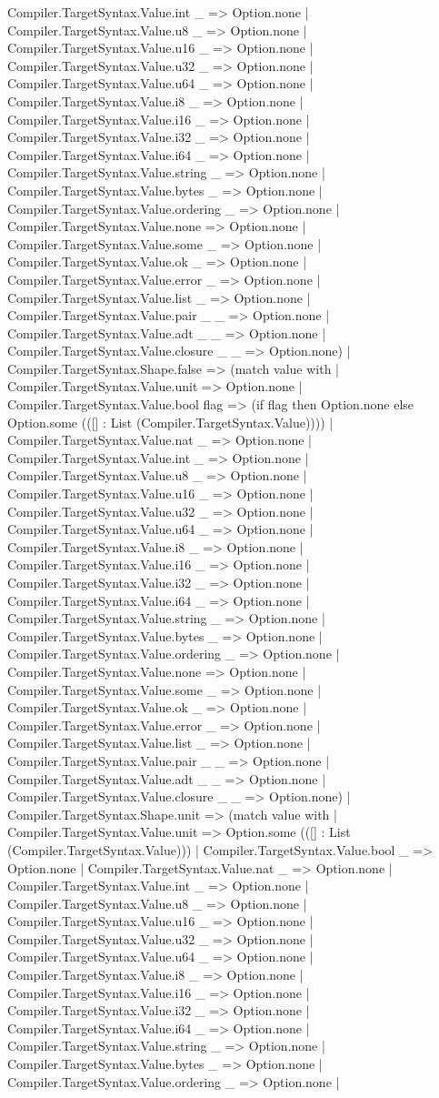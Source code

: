 \documentclass[11pt]{article}
\begin{document}
Compiler.TargetSyntax.Value.int \_ => Option.none | Compiler.TargetSyntax.Value.u8 \_ => Option.none | Compiler.TargetSyntax.Value.u16 \_ => Option.none | Compiler.TargetSyntax.Value.u32 \_ => Option.none | Compiler.TargetSyntax.Value.u64 \_ => Option.none | Compiler.TargetSyntax.Value.i8 \_ => Option.none | Compiler.TargetSyntax.Value.i16 \_ => Option.none | Compiler.TargetSyntax.Value.i32 \_ => Option.none | Compiler.TargetSyntax.Value.i64 \_ => Option.none | Compiler.TargetSyntax.Value.string \_ => Option.none | Compiler.TargetSyntax.Value.bytes \_ => Option.none | Compiler.TargetSyntax.Value.ordering \_ => Option.none | Compiler.TargetSyntax.Value.none => Option.none | Compiler.TargetSyntax.Value.some \_ => Option.none | Compiler.TargetSyntax.Value.ok \_ => Option.none | Compiler.TargetSyntax.Value.error \_ => Option.none | Compiler.TargetSyntax.Value.list \_ => Option.none | Compiler.TargetSyntax.Value.pair \_ \_ => Option.none | Compiler.TargetSyntax.Value.adt \_ \_ => Option.none | Compiler.TargetSyntax.Value.closure \_ \_ => Option.none) | Compiler.TargetSyntax.Shape.false => (match value with | Compiler.TargetSyntax.Value.unit => Option.none | Compiler.TargetSyntax.Value.bool flag => (if flag then Option.none else Option.some (([] : List (Compiler.TargetSyntax.Value)))) | Compiler.TargetSyntax.Value.nat \_ => Option.none | Compiler.TargetSyntax.Value.int \_ => Option.none | Compiler.TargetSyntax.Value.u8 \_ => Option.none | Compiler.TargetSyntax.Value.u16 \_ => Option.none | Compiler.TargetSyntax.Value.u32 \_ => Option.none | Compiler.TargetSyntax.Value.u64 \_ => Option.none | Compiler.TargetSyntax.Value.i8 \_ => Option.none | Compiler.TargetSyntax.Value.i16 \_ => Option.none | Compiler.TargetSyntax.Value.i32 \_ => Option.none | Compiler.TargetSyntax.Value.i64 \_ => Option.none | Compiler.TargetSyntax.Value.string \_ => Option.none | Compiler.TargetSyntax.Value.bytes \_ => Option.none | Compiler.TargetSyntax.Value.ordering \_ => Option.none | Compiler.TargetSyntax.Value.none => Option.none | Compiler.TargetSyntax.Value.some \_ => Option.none | Compiler.TargetSyntax.Value.ok \_ => Option.none | Compiler.TargetSyntax.Value.error \_ => Option.none | Compiler.TargetSyntax.Value.list \_ => Option.none | Compiler.TargetSyntax.Value.pair \_ \_ => Option.none | Compiler.TargetSyntax.Value.adt \_ \_ => Option.none | Compiler.TargetSyntax.Value.closure \_ \_ => Option.none) | Compiler.TargetSyntax.Shape.unit => (match value with | Compiler.TargetSyntax.Value.unit => Option.some (([] : List (Compiler.TargetSyntax.Value))) | Compiler.TargetSyntax.Value.bool \_ => Option.none | Compiler.TargetSyntax.Value.nat \_ => Option.none | Compiler.TargetSyntax.Value.int \_ => Option.none | Compiler.TargetSyntax.Value.u8 \_ => Option.none | Compiler.TargetSyntax.Value.u16 \_ => Option.none | Compiler.TargetSyntax.Value.u32 \_ => Option.none | Compiler.TargetSyntax.Value.u64 \_ => Option.none | Compiler.TargetSyntax.Value.i8 \_ => Option.none | Compiler.TargetSyntax.Value.i16 \_ => Option.none | Compiler.TargetSyntax.Value.i32 \_ => Option.none | Compiler.TargetSyntax.Value.i64 \_ => Option.none | Compiler.TargetSyntax.Value.string \_ => Option.none | Compiler.TargetSyntax.Value.bytes \_ => Option.none | Compiler.TargetSyntax.Value.ordering \_ => Option.none | 
\end{document}

